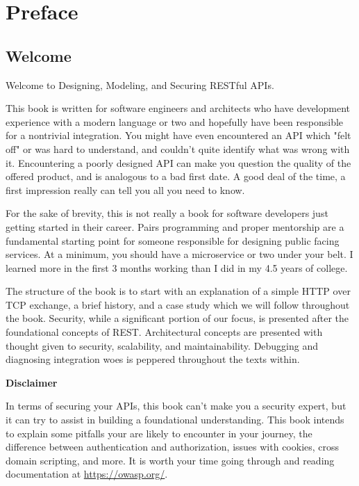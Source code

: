 \chapter*{Preface}

\section*{Welcome}

Welcome to Designing, Modeling, and Securing RESTful APIs.

This book is written for software engineers and architects who have development experience with a modern language or two and hopefully have been responsible for a nontrivial integration.  You might have even encountered an API which "felt off" or was hard to understand, and couldn't quite identify what was wrong with it.  Encountering a poorly designed API can make you question the quality of the offered product, and is analogous to a bad first date.  A good deal of the time, a first impression really can tell you all you need to know.

For the sake of brevity, this is not really a book for software developers just getting started in their career.  Pairs programming and proper mentorship are a fundamental starting point for someone responsible for designing public facing services.  At a minimum, you should have a microservice or two under your belt.  I learned more in the first 3 months working than I did in my 4.5 years of college.

The structure of the book is to start with an explanation of a simple HTTP over TCP exchange, a brief history, and a case study which we will follow throughout the book.  Security, while a significant portion of our focus, is presented after the foundational concepts of REST.  Architectural concepts are presented with thought given to security, scalability, and maintainability. Debugging and diagnosing integration woes is peppered throughout the texts within.

\begin{sidebar}
\begin{center}
\textbf{Disclaimer}
\end{center}
In terms of securing your APIs, this book can't make you a security expert, but it can try to assist in building a foundational understanding.  This book intends to explain some pitfalls your are likely to encounter in your journey, the difference between authentication and authorization, issues with cookies, cross domain scripting, and more.  It is worth your time going through and reading documentation at \url{https://owasp.org/}.
\end{sidebar}


